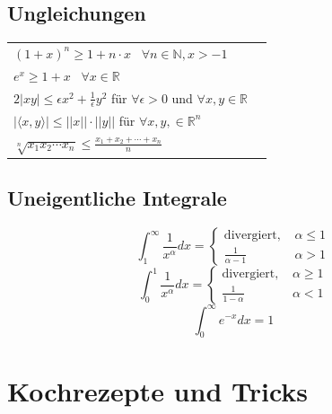 \documentclass[a4paper,10pt]{article}
\begin{document}
\subsection{Ungleichungen}
\begin{center}
  \begin{tabularx}{\linewidth}{>{\centering\arraybackslash}X>{\centering\arraybackslash}X}
    $(1+x)^n \geq 1+ n\cdot x$ \, $\forall n\in \mathbb{N}, x > -1$\\
    $e^x \geq 1 + x$ \, $\forall x\in \mathbb{R}$\\
    $2|xy| \leq \epsilon x^2 + \frac{1}{\epsilon} y^2$ für $\forall \epsilon > 0$ und $\forall x,y \in \mathbb{R}$\\
    $|\langle x,y \rangle| \leq ||x|| \cdot ||y||$ für $\forall x,y, \in \mathbb{R}^n$\\
    $\sqrt[n]{x_1 x_2 \cdots x_n} \leq \frac{x_1 + x_2 + \cdots + x_n}{n}$
  \end{tabularx}
\end{center}

\subsection{Uneigentliche Integrale}
$$\int_1^\infty \frac{1}{x^\alpha} dx = \begin{cases}
  \text{divergiert, } & \alpha \leq 1\\
  \frac{1}{\alpha - 1} & \alpha > 1
\end{cases}$$
$$\int_0^1 \frac{1}{x^\alpha} dx = \begin{cases}
  \text{divergiert, } & \alpha \geq 1\\
  \frac{1}{1- \alpha} & \alpha < 1
\end{cases}$$
$$\int_0^\infty e^{-x}dx = 1$$

\section{Kochrezepte und Tricks}
\end{document}
